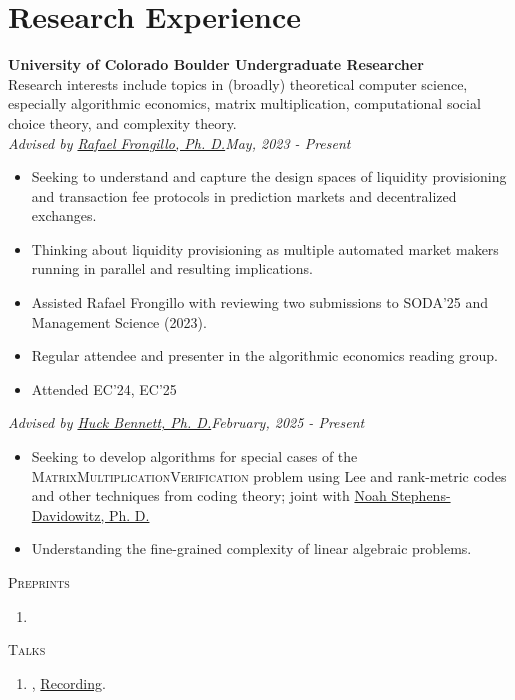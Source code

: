 \documentclass[a4paper,20pt]{article}
\begin{document}
    \section{Research Experience}
    \textbf{University of Colorado Boulder \hfill{Undergraduate Researcher}} \\
    Research interests include topics in (broadly) theoretical computer science, especially algorithmic economics, matrix multiplication, computational social choice theory, and complexity theory.
    \\
    \emph{Advised by \href{https://raf.prof}{Rafael Frongillo, Ph. D.}}\hfill{\textit{May, 2023 - Present}}
    \\
    \begin{itemize}[label=-]
      \vspace{-5pt}
      \item Seeking to understand and capture the design spaces of liquidity provisioning and transaction fee protocols in prediction markets and decentralized exchanges.
      \vspace{-5pt}
      \item Thinking about liquidity provisioning as multiple automated market makers running in parallel and resulting implications.
      \vspace{-5pt}
      \item Assisted Rafael Frongillo with reviewing two submissions to SODA'25 and Management Science (2023).
      \vspace{-5pt}
      \item Regular attendee and presenter in the algorithmic economics reading group.
      \vspace{-5pt}
      \item Attended EC'24, EC'25
   \end{itemize}
   \emph{Advised by \href{https://home.cs.colorado.edu/~hbennett/}{Huck Bennett, Ph. D.}}\hfill{\textit{February, 2025 - Present}}
   \\
    \begin{itemize}[label=-]
      \vspace{-5pt}
      \item Seeking to develop algorithms for special cases of the \textsc{MatrixMultiplicationVerification} problem using Lee and rank-metric codes and other techniques from coding theory; joint with \href{https://www.noahsd.com}{Noah Stephens-Davidowitz, Ph. D.} 
      \item Understanding the fine-grained complexity of linear algebraic problems.
      \vspace{-5pt}
   \end{itemize} 
   \textsc{Preprints}
   \begin{enumerate}
    \item {}
  \end{enumerate}
  \textsc{Talks}
  \begin{enumerate}
    \item {}, \href{https://www.youtube.com/watch?v=JWsXMNSOygA}{Recording}.
  \end{enumerate}
\end{document}
